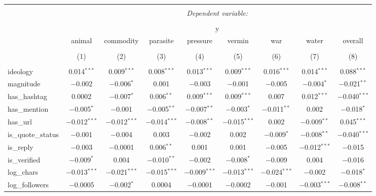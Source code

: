 
\begin{table}[!htbp] \centering 
  \caption{} 
  \label{} 
\begin{tabular}{@{\extracolsep{5pt}}lcccccccc} 
\\[-1.8ex]\hline 
\hline \\[-1.8ex] 
 & \multicolumn{8}{c}{\textit{Dependent variable:}} \\ 
\cline{2-9} 
\\[-1.8ex] & \multicolumn{8}{c}{y} \\ 
 & animal & commodity & parasite & pressure & vermin & war & water & overall \\ 
\\[-1.8ex] & (1) & (2) & (3) & (4) & (5) & (6) & (7) & (8)\\ 
\hline \\[-1.8ex] 
 ideology & 0.014$^{***}$ & 0.009$^{***}$ & 0.008$^{***}$ & 0.013$^{***}$ & 0.009$^{***}$ & 0.016$^{***}$ & 0.014$^{***}$ & 0.088$^{***}$ \\ 
  magnitude & $-$0.002 & $-$0.006$^{*}$ & 0.001 & $-$0.003 & $-$0.001 & $-$0.005 & $-$0.004$^{*}$ & $-$0.021$^{**}$ \\ 
  has\_hashtag & 0.0002 & $-$0.007$^{*}$ & 0.006$^{**}$ & 0.009$^{***}$ & 0.009$^{***}$ & 0.007 & 0.012$^{***}$ & $-$0.040$^{***}$ \\ 
  has\_mention & $-$0.005$^{*}$ & $-$0.001 & $-$0.005$^{**}$ & $-$0.007$^{**}$ & $-$0.003$^{*}$ & $-$0.011$^{**}$ & 0.002 & $-$0.018$^{*}$ \\ 
  has\_url & $-$0.012$^{***}$ & $-$0.012$^{***}$ & $-$0.014$^{***}$ & $-$0.008$^{**}$ & $-$0.015$^{***}$ & 0.002 & $-$0.009$^{**}$ & 0.045$^{***}$ \\ 
  is\_quote\_status & $-$0.001 & $-$0.004 & 0.003 & $-$0.002 & 0.002 & $-$0.009$^{*}$ & $-$0.008$^{**}$ & $-$0.040$^{***}$ \\ 
  is\_reply & $-$0.003 & $-$0.0001 & 0.006$^{**}$ & 0.001 & 0.001 & $-$0.005 & $-$0.012$^{***}$ & $-$0.015 \\ 
  is\_verified & $-$0.009$^{*}$ & 0.004 & $-$0.010$^{**}$ & $-$0.002 & $-$0.008$^{*}$ & $-$0.009 & 0.004 & $-$0.016 \\ 
  log\_chars & $-$0.013$^{***}$ & $-$0.021$^{***}$ & $-$0.015$^{***}$ & $-$0.009$^{***}$ & $-$0.013$^{***}$ & $-$0.024$^{***}$ & $-$0.002 & $-$0.018$^{*}$ \\ 
  log\_followers & $-$0.0005 & $-$0.002$^{*}$ & 0.0004 & $-$0.0001 & $-$0.0002 & $-$0.001 & $-$0.003$^{***}$ & $-$0.008$^{**}$ \\ 

\end{tabular}
\end{table}
